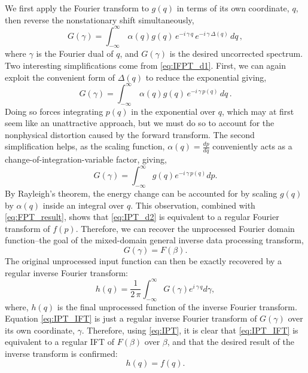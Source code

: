 We first apply the Fourier transform to $g \left( q \right)$ in terms of its own coordinate, $q$, then reverse the nonstationary shift simultaneously,
\begin{equation}
	\label{eq:IFPT_d1}
	G\left(\gamma \right) = \int_{-\infty}^{\infty} \, \alpha \left( q \right) g \left( q \right) \, e^{-i \, \gamma \, q} \, e^{-i \, \gamma \, \Delta \left( q \right)} \, dq \, ,
\end{equation}
where $\gamma $ is the Fourier dual of $q$, and $G(\gamma )$ is the desired uncorrected spectrum. 
Two interesting simplifications come from \ref{eq:IFPT_d1}.  
First, we can again exploit the convenient form of $\Delta (q)$ to reduce the exponential giving,
\begin{equation}
	\label{eq:IPT_full}
	G \left( \gamma \right) = \int_{-\infty}^{\infty} \, \alpha \left( q \right) g \left( q \right) \, e^{-i \, \gamma \, p(q)} \, dq \, .
\end{equation}
Doing so forces integrating $p \left( q \right)$ in the exponential over $q$, which may at first seem like an unattractive approach, but we must do so to account for the nonphysical distortion caused by the forward transform.
The second simplification helps, as the scaling function, $\alpha (q)=\frac{d p}{d q}$ conveniently acts as a change-of-integration-variable factor, giving,
\begin{equation}
  \label{eq:IPT_d2}
  G\left( \gamma \right) = \int_{-\infty}^{\infty} g \left( q \right)e^{-i \, \gamma \, p\left( q \right)}dp .
\end{equation}
By Rayleigh's theorem, the energy change can be accounted for by scaling $g \left( q \right)$ by $\alpha \left( q \right)$ inside an integral over $q$.  This observation, combined with \ref{eq:FPT_result}, shows that \ref{eq:IPT_d2} is equivalent to a regular Fourier transform of $f(p)$.  Therefore, we can recover the unprocessed Fourier domain function--the goal of the mixed-domain general inverse data processing transform,
\begin{equation}
	\label{eq:IPT}
	G\left( \gamma \right) = F\left( \beta \right).
\end{equation}
The original unprocessed input function can then be exactly recovered by a regular inverse Fourier transform:
\begin{equation}
h\left( q \right) = \frac{1}{2 \, \pi}\int_{-\infty}^{\infty}G \left( \gamma \right) e^{i \, \gamma \, q}d\gamma,
\label{eq:IPT_IFT}
\end{equation}
\noindent where, $h(q)$ is the final unprocessed function of the inverse Fourier transform.  Equation \ref{eq:IPT_IFT} is just a regular inverse Fourier transform of $G(\gamma )$ over its own coordinate, $\gamma $.  Therefore, using \ref{eq:IPT}, it is clear that \ref{eq:IPT_IFT} is  equivalent to a regular IFT of $F(\beta )$ over $\beta $, and that the desired result of the inverse transform is confirmed:
\begin{equation}
h\left( q \right)=f\left( q \right).
\label{eq:IPT_result}
\end{equation}


